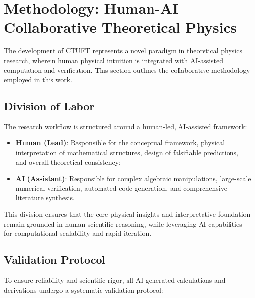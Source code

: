 \section{Methodology: Human-AI Collaborative Theoretical Physics}
\label{sec:methodology}

The development of CTUFT represents a novel paradigm in theoretical 
physics research, wherein human physical intuition is integrated with 
AI-assisted computation and verification. This section outlines the 
collaborative methodology employed in this work.

\subsection{Division of Labor}

The research workflow is structured around a human-led, AI-assisted 
framework:

\begin{itemize}
    \item \textbf{Human (Lead)}: Responsible for the conceptual framework, 
          physical interpretation of mathematical structures, design of 
          falsifiable predictions, and overall theoretical consistency;
    
    \item \textbf{AI (Assistant)}: Responsible for complex algebraic 
          manipulations, large-scale numerical verification, automated 
          code generation, and comprehensive literature synthesis.
\end{itemize}

This division ensures that the core physical insights and interpretative 
foundation remain grounded in human scientific reasoning, while leveraging 
AI capabilities for computational scalability and rapid iteration.

\subsection{Validation Protocol}

To ensure reliability and scientific rigor, all AI-generated calculations 
and derivations undergo a systematic validation protocol:

